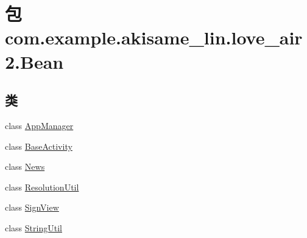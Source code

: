 \hypertarget{namespacecom_1_1example_1_1akisame__lin_1_1love__air2_1_1_bean}{}\section{包 com.\+example.\+akisame\+\_\+lin.\+love\+\_\+air2.\+Bean}
\label{namespacecom_1_1example_1_1akisame__lin_1_1love__air2_1_1_bean}
\subsection*{类}
\begin{DoxyCompactItemize}
\item 
class \mbox{\hyperlink{classcom_1_1example_1_1akisame__lin_1_1love__air2_1_1_bean_1_1_app_manager}{App\+Manager}}
\item 
class \mbox{\hyperlink{classcom_1_1example_1_1akisame__lin_1_1love__air2_1_1_bean_1_1_base_activity}{Base\+Activity}}
\item 
class \mbox{\hyperlink{classcom_1_1example_1_1akisame__lin_1_1love__air2_1_1_bean_1_1_news}{News}}
\item 
class \mbox{\hyperlink{classcom_1_1example_1_1akisame__lin_1_1love__air2_1_1_bean_1_1_resolution_util}{Resolution\+Util}}
\item 
class \mbox{\hyperlink{classcom_1_1example_1_1akisame__lin_1_1love__air2_1_1_bean_1_1_sign_view}{Sign\+View}}
\item 
class \mbox{\hyperlink{classcom_1_1example_1_1akisame__lin_1_1love__air2_1_1_bean_1_1_string_util}{String\+Util}}
\end{DoxyCompactItemize}
